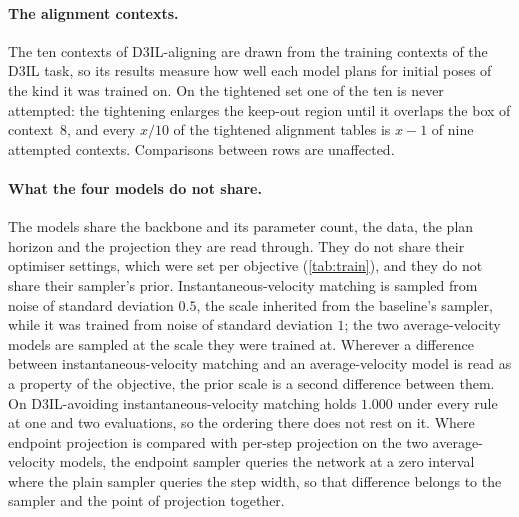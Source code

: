 \paragraph{The alignment contexts.} The ten contexts of D3IL-aligning are drawn from the training
contexts of the D3IL task, so its results measure how well each model plans for initial poses of the
kind it was trained on. On the tightened set one of the ten is never attempted: the tightening enlarges
the keep-out region until it overlaps the box of context~8, and every $x/10$ of the tightened alignment
tables is $x-1$ of nine attempted contexts. Comparisons between rows are unaffected.

\paragraph{What the four models do not share.} The models share the backbone and its parameter count,
the data, the plan horizon and the projection they are read through. They do not share their
optimiser settings, which were set per objective (\autoref{tab:train}), and they do not share their
sampler's prior. Instantaneous-velocity matching is sampled from noise of standard deviation $0.5$,
the scale inherited from the baseline's sampler, while it was trained from noise of standard deviation
$1$; the two average-velocity models are sampled at the scale they were trained at. Wherever a
difference between instantaneous-velocity matching and an average-velocity model is read as a property
of the objective, the prior scale is a second difference between them. On D3IL-avoiding
instantaneous-velocity matching holds $1.000$ under every rule at one and two evaluations, so the
ordering there does not rest on it. Where endpoint projection is compared with per-step projection on
the two average-velocity models, the endpoint sampler queries the network at a zero interval where the
plain sampler queries the step width, so that difference belongs to the sampler and the point of
projection together.

